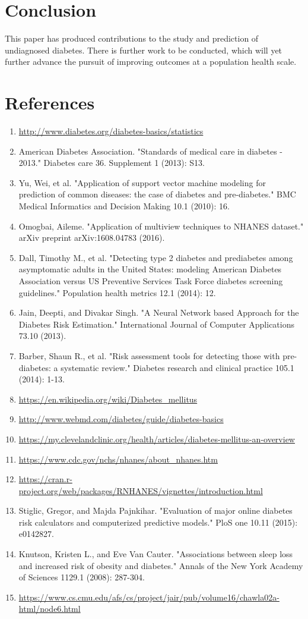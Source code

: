 \documentclass[twoside,11pt]{article}
\begin{document}
\section{Conclusion} 
This paper has produced contributions to the study and prediction of undiagnosed diabetes. There is further work to be conducted, which will yet further advance the pursuit of improving outcomes at a population health scale. 

\section{References}
\begin{enumerate}
\item \url{http://www.diabetes.org/diabetes-basics/statistics}
\item American Diabetes Association. "Standards of medical care in diabetes - 2013." Diabetes care 36. Supplement 1 (2013): S13.
\item Yu, Wei, et al. "Application of support vector machine modeling for prediction of common diseases: the case of diabetes and pre-diabetes." BMC Medical Informatics and Decision Making 10.1 (2010): 16.
\item Omogbai, Aileme. "Application of multiview techniques to NHANES dataset." arXiv preprint arXiv:1608.04783 (2016).
\item Dall, Timothy M., et al. "Detecting type 2 diabetes and prediabetes among asymptomatic adults in the United States: modeling American Diabetes Association versus US Preventive Services Task Force diabetes screening guidelines." Population health metrics 12.1 (2014): 12.
\item Jain, Deepti, and Divakar Singh. "A Neural Network based Approach for the Diabetes Risk Estimation." International Journal of Computer Applications 73.10 (2013).
\item Barber, Shaun R., et al. "Risk assessment tools for detecting those with pre-diabetes: a systematic review." Diabetes research and clinical practice 105.1 (2014): 1-13.
\item \url{https://en.wikipedia.org/wiki/Diabetes_mellitus}
\item \url{http://www.webmd.com/diabetes/guide/diabetes-basics}
\item \url{https://my.clevelandclinic.org/health/articles/diabetes-mellitus-an-overview}
\item \url{https://www.cdc.gov/nchs/nhanes/about_nhanes.htm}
\item \url{https://cran.r-project.org/web/packages/RNHANES/vignettes/introduction.html}
\item Stiglic, Gregor, and Majda Pajnkihar. "Evaluation of major online diabetes risk calculators and computerized predictive models." PloS one 10.11 (2015): e0142827.
\item Knutson, Kristen L., and Eve Van Cauter. "Associations between sleep loss and increased risk of obesity and diabetes." Annals of the New York Academy of Sciences 1129.1 (2008): 287-304.
\item \url{https://www.cs.cmu.edu/afs/cs/project/jair/pub/volume16/chawla02a-html/node6.html}
\end{enumerate}
\end{document}
